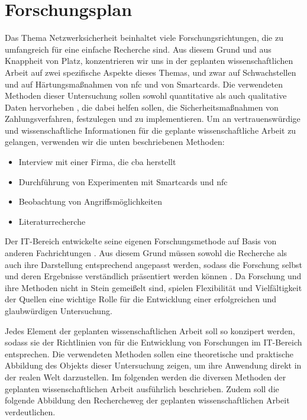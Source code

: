 \section{Forschungsplan}

Das Thema Netzwerksicherheit beinhaltet viele Forschungsrichtungen, die zu umfangreich für eine einfache
Recherche sind. Aus diesem Grund und aus Knappheit von Platz, konzentrieren wir uns in der geplanten 
wissenschaftlichen Arbeit auf zwei spezifische Aspekte dieses Themas, und zwar auf Schwachstellen und 
auf Härtungsmaßnahmen von \acrshort{nfc} und von Smartcards. Die verwendeten Methoden dieser Untersuchung 
sollen sowohl quantitative als auch qualitative Daten hervorheben \cite{refbook:RMJL}, die dabei helfen sollen, 
die Sicherheitsmaßnahmen von Zahlungsverfahren, festzulegen und zu implementieren. Um an vertrauenswürdige 
und wissenschaftliche Informationen für die geplante wissenschaftliche Arbeit zu gelangen, verwenden wir 
die unten beschriebenen Methoden:

\begin{itemize}
  \item Interview mit einer Firma, die \acrfull{cba} herstellt
  \item Durchführung von Experimenten mit Smartcards und \acrshort{nfc}
  \item Beobachtung von Angriffsmöglichkeiten
  \item Literaturrecherche
\end{itemize}

Der IT-Bereich entwickelte seine eigenen Forschungsmethode auf Basis von anderen Fachrichtungen \cite{inbook:AHDS}.
Aus diesem Grund müssen sowohl die Recherche als auch ihre Darstellung entsprechend angepasst werden, sodass 
die Forschung selbst und deren Ergebnisse verständlich präsentiert werden können \cite{refbook:RMJL}. Da Forschung und 
ihre Methoden nicht in Stein gemeißelt sind, spielen Flexibilität und Vielfältigkeit der Quellen eine wichtige 
Rolle für die Entwicklung einer erfolgreichen und glaubwürdigen Untersuchung.

Jedes Element der geplanten wissenschaftlichen Arbeit soll so konzipert werden, sodass sie der Richtlinien von
\cite{refip:SGRM} für die Entwicklung von Forschungen im IT-Bereich entsprechen. Die verwendeten Methoden 
sollen eine theoretische und praktische Abbildung des Objekts dieser Untersuchung zeigen, um ihre Anwendung 
direkt in der realen Welt darzustellen. Im folgenden werden die diversen Methoden der geplanten wissenschaftlichen 
Arbeit ausführlich beschrieben. Zudem soll die folgende Abbildung den Rechercheweg der geplanten wissenschaftlichen 
Arbeit verdeutlichen.


